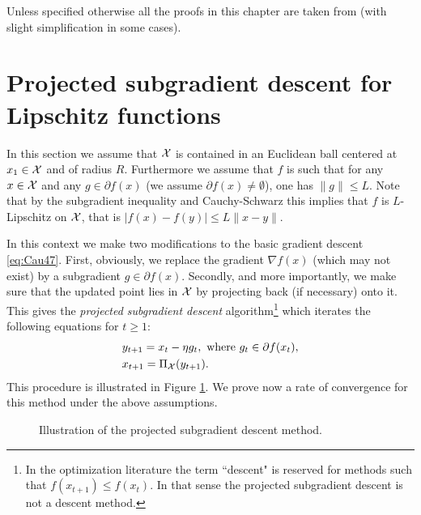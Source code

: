 Unless specified otherwise all the proofs in this chapter are taken from \cite{Nes04} (with slight simplification in some cases).

\section{Projected subgradient descent for Lipschitz functions} \label{sec:psgd}
In this section we assume that $\mathcal{X}$ is contained in an Euclidean ball centered at $x_1 \in \mathcal{X}$ and of radius $R$. Furthermore we assume that $f$ is such that for any $x \in \mathcal{X}$ and any $g \in \partial f(x)$ (we assume $\partial f(x) \neq \emptyset$), one has $\|g\| \leq L$. Note that by the subgradient inequality and Cauchy-Schwarz this implies that $f$ is $L$-Lipschitz on $\mathcal{X}$, that is $|f(x) - f(y)| \leq L \|x-y\|$. 

In this context we make two modifications to the basic gradient descent \eqref{eq:Cau47}. First, obviously, we replace the gradient $\nabla f(x)$ (which may not exist) by a subgradient $g \in \partial f(x)$. Secondly, and more importantly, we make sure that the updated point lies in $\mathcal{X}$ by projecting back (if necessary) onto it. This gives the {\em projected subgradient descent} algorithm\footnote{In the optimization literature the term ``descent" is reserved for methods such that $f(x_{t+1}) \leq f(x_t)$. In that sense the projected subgradient descent is not a descent method.} which iterates the following equations for $t \geq 1$:
\begin{align}
& y_{t+1} = x_t - \eta g_t , \ \text{where} \ g_t \in \partial f(x_t) , \label{eq:PGD1}\\
& x_{t+1} = \Pi_{\mathcal{X}}(y_{t+1}) . \label{eq:PGD2}
\end{align}
This procedure is illustrated in Figure \ref{fig:pgd}. We prove now a rate of convergence for this method under the above assumptions.

\begin{figure}
\begin{center}
\end{center}
\caption{Illustration of the projected subgradient descent method.}
\label{fig:pgd}
\end{figure}

